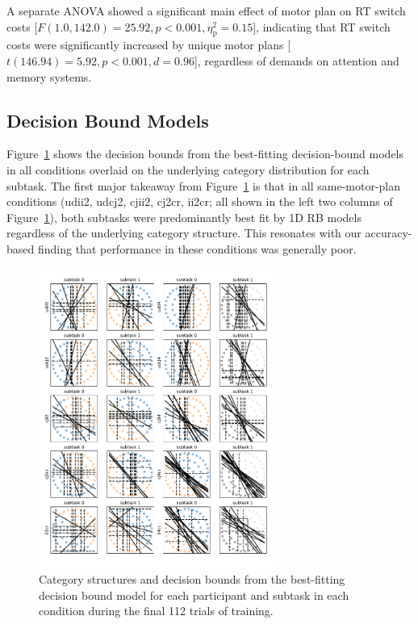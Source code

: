 \documentclass[doc, floatsintext]{apa7}
\begin{document}
A separate ANOVA showed a significant main effect of motor
plan on RT switch costs [$F(1.0, 142.0) = 25.92, p < 0.001,
\eta_{\text{p}}^{2} = 0.15$], indicating that RT switch
costs were significantly increased by unique motor plans
[$t(146.94) = 5.92, p < 0.001, d = 0.96$], regardless of
demands on attention and memory systems.

\subsection{Decision Bound Models}
Figure~\ref{fig_7} shows the decision bounds from the
best-fitting decision-bound models in all conditions
overlaid on the underlying category distribution for each
subtask. The first major takeaway from Figure~\ref{fig_7}
is that in all same-motor-plan conditions (udii2, udcj2,
cjii2, cj2cr, ii2cr; all shown in the left two columns of
Figure~\ref{fig_7}), both subtasks were predominantly best
fit by 1D RB models regardless of the underlying category
structure. This resonates with our accuracy-based finding
that performance in these conditions was generally poor. 

\begin{figure}[h!]
    \centering
    \includegraphics[width=0.7\textwidth]{../figures/fig_7.pdf}
    \caption{
        Category structures and decision bounds from the
        best-fitting decision bound model for each participant
        and subtask in each condition during the final 112
        trials of training.
    }
    \label{fig_7}
\end{figure}
\end{document}
